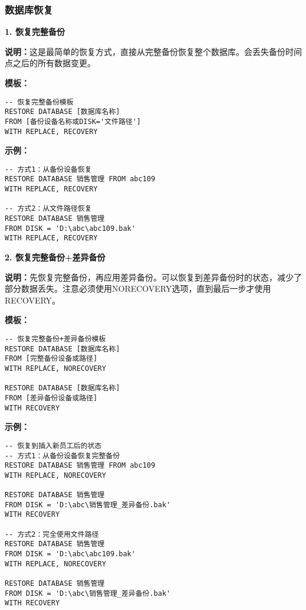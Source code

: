 \subsubsection{数据库恢复}

\textbf{1. 恢复完整备份}

\qquad \textbf{说明：}这是最简单的恢复方式，直接从完整备份恢复整个数据库。会丢失备份时间点之后的所有数据变更。

\qquad \textbf{模板：}
\begin{mdframed}[backgroundcolor=gray!10]
\begin{verbatim}
-- 恢复完整备份模板
RESTORE DATABASE [数据库名称]
FROM [备份设备名称或DISK='文件路径']
WITH REPLACE, RECOVERY
\end{verbatim}
\end{mdframed}

\qquad \textbf{示例：}
\begin{mdframed}[backgroundcolor=blue!5]
\begin{verbatim}
-- 方式1：从备份设备恢复
RESTORE DATABASE 销售管理 FROM abc109
WITH REPLACE, RECOVERY

-- 方式2：从文件路径恢复
RESTORE DATABASE 销售管理
FROM DISK = 'D:\abc\abc109.bak'
WITH REPLACE, RECOVERY
\end{verbatim}
\end{mdframed}

\textbf{2. 恢复完整备份+差异备份}

\qquad \textbf{说明：}先恢复完整备份，再应用差异备份。可以恢复到差异备份时的状态，减少了部分数据丢失。注意必须使用NORECOVERY选项，直到最后一步才使用RECOVERY。

\qquad \textbf{模板：}
\begin{mdframed}[backgroundcolor=gray!10]
\begin{verbatim}
-- 恢复完整备份+差异备份模板
RESTORE DATABASE [数据库名称]
FROM [完整备份设备或路径]
WITH REPLACE, NORECOVERY

RESTORE DATABASE [数据库名称]
FROM [差异备份设备或路径]
WITH RECOVERY
\end{verbatim}
\end{mdframed}

\qquad \textbf{示例：}
\begin{mdframed}[backgroundcolor=blue!5]
\begin{verbatim}
-- 恢复到插入新员工后的状态
-- 方式1：从备份设备恢复完整备份
RESTORE DATABASE 销售管理 FROM abc109
WITH REPLACE, NORECOVERY

RESTORE DATABASE 销售管理
FROM DISK = 'D:\abc\销售管理_差异备份.bak'
WITH RECOVERY

-- 方式2：完全使用文件路径
RESTORE DATABASE 销售管理
FROM DISK = 'D:\abc\abc109.bak'
WITH REPLACE, NORECOVERY

RESTORE DATABASE 销售管理
FROM DISK = 'D:\abc\销售管理_差异备份.bak'
WITH RECOVERY
\end{verbatim}
\end{mdframed}

